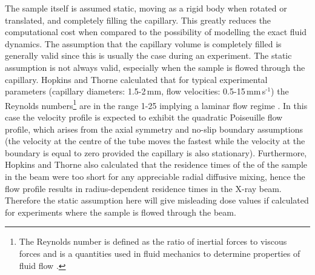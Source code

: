 The sample itself is assumed static, moving as a rigid body when rotated or translated, and completely filling the capillary.
This greatly reduces the computational cost when compared to the possibility of modelling the exact fluid dynamics.
The assumption that the capillary volume is completely filled is generally valid since this is usually the case during an experiment.
The static assumption is not always valid, especially when the sample is flowed through the capillary.
Hopkins and Thorne calculated that for typical experimental parameters (capillary diameters: 1.5-2$\,$mm, flow velocities: 0.5-15$\,$mm$\,$s$^{\text{-1}}$) the Reynolds numbers\footnote{The Reynolds number is defined as the ratio of inertial forces to viscous forces and is a quantities used in fluid mechanics to determine properties of fluid flow \cite{purcell1977life}.} are in the range 1-25 implying a laminar flow regime \cite{hopkins2016quantifying}.
In this case the velocity profile is expected to exhibit the quadratic Poiseuille flow profile, which arises from the axial symmetry and no-slip boundary assumptions (the velocity at the centre of the tube moves the fastest while the velocity at the boundary is equal to zero provided the capillary is also stationary).
Furthermore, Hopkins and Thorne also calculated that the residence times of the of the sample in the beam were too short for any appreciable radial diffusive mixing, hence the flow profile results in radius-dependent residence times in the X-ray beam.
Therefore the static assumption here will give misleading dose values if calculated for experiments where the sample is flowed through the beam.

